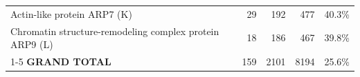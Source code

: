 \begin{longtable}{@{}p{7.5cm}rrrl@{}}
  Actin-like protein ARP7 (K) & \multicolumn{1}{r}{29} & \multicolumn{1}{r}{192} & \multicolumn{1}{r}{477} & \multicolumn{1}{c}{40.3\%} \\
  Chromatin structure-remodeling complex protein ARP9 (L) & \multicolumn{1}{r}{18} & \multicolumn{1}{r}{186} & \multicolumn{1}{r}{467} & \multicolumn{1}{c}{39.8\%} \\
  \cmidrule(r){1-5}
  \textbf{GRAND TOTAL} & \multicolumn{1}{r}{159} & \multicolumn{1}{r}{2101} & \multicolumn{1}{r}{8194} & \multicolumn{1}{c}{25.6\%} \\
\end{longtable}
